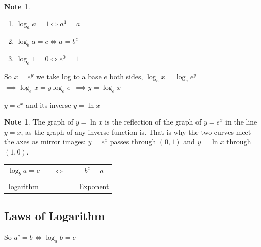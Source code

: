 \documentclass[11pt,a4paper]{article}
\theoremstyle{definition}
\newtheorem{note}[thm]{Note}
\begin{document}
\begin{note}

\begin{enumerate}
\item $\log_aa=1\iff a^1=a$
\item $\log_ba=c\iff a=b^c$
\item $\log_e1=0\iff e^0=1$
\end{enumerate}


So $x=e^y$ we take log to a base $e$ both sides, $\log_ex=\log_ee^y$\\

$\implies \log_ex=y\log_ee$ \,$\implies y=\log_ex$\\



\begin{figure}[H]
\centering
{}
\end{figure}



$y=e^x$ and its inverse $y=\ln x$
\end{note}
\begin{note}
The graph of $y=\ln x$ is the reflection of the graph of $y=e^{x}$ in the line
$y=x$, as the graph of any inverse function is. That is why the two curves meet the
axes as mirror images: $y=e^{x}$ passes through $(0,1)$ and $y=\ln x$ through
$(1,0)$.\\

\begin{table}[h!]
\centering
\begin{tabular}{ccccc}
$\log_{\displaystyle {b}}a=c$ && $\iff$ && ${\displaystyle {b^{\displaystyle{c}}=a}}$\\\\
logarithm &&&& Exponent\\
\end{tabular}
\end{table}
\end{note}
\subsection{Laws of Logarithm}
So $a^{\displaystyle{c}}=b\iff \log_{\displaystyle{a}}b=c$\\
\end{document}
